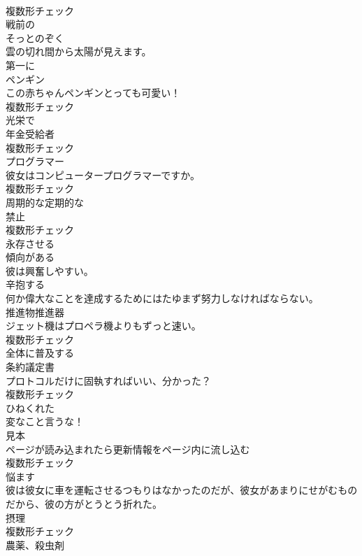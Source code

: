 \documentclass[8pt]{extreport}
\begin{document}
\begin{CJK}{UTF8}{min}
\\	複数形チェック
\\	[形容詞]	戦前の	
\\	[動詞]	そっとのぞく	
\\	雲の切れ間から太陽が見えます。	
\\	[副詞]	第一に	
\\	[名詞]	ペンギン	
\\	この赤ちゃんペンギンとっても可愛い！	
\\	複数形チェック
\\	[形容詞]	光栄で	
\\	[名詞]	年金受給者	
\\	複数形チェック
\\	[名詞]	プログラマー	
\\	彼女はコンピュータープログラマーですか。	
\\	複数形チェック
\\	[形容詞]	周期的な定期的な	
\\	[名詞]	禁止	
\\	複数形チェック
\\	[動詞]	永存させる	
\\	[形容詞]	傾向がある	
\\	彼は興奮しやすい。	
\\	[動詞]	辛抱する	
\\	何か偉大なことを達成するためにはたゆまず努力しなければならない。	
\\	[名詞]	推進物推進器	
\\	ジェット機はプロペラ機よりもずっと速い。	
\\	複数形チェック
\\	[動詞]	全体に普及する	
\\	[名詞]	条約議定書	
\\	プロトコルだけに固執すればいい、分かった？	
\\	複数形チェック
\\	[形容詞]	ひねくれた	
\\	変なこと言うな！	
\\	[名詞]	見本	
\\	ページが読み込まれたら更新情報をページ内に流し込む　
\\	複数形チェック
\\	[動詞]	悩ます	
\\	彼は彼女に車を運転させるつもりはなかったのだが、彼女があまりにせがむものだから、彼の方がとうとう折れた。	
\\	[名詞]	摂理	
\\	複数形チェック
\\	[名詞]	農薬、殺虫剤	

\end{CJK}
\end{document}

